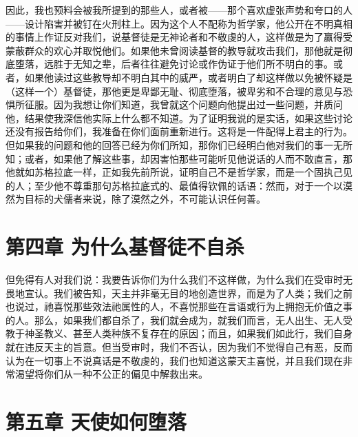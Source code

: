 因此，我也预料会被我所提到的那些人，或者被——那个喜欢虚张声势和夸口的人——设计陷害并被钉在火刑柱上。因为这个人不配称为哲学家，他公开在不明真相的事情上作证反对我们，说基督徒是无神论者和不敬虔的人，这样做是为了赢得受蒙蔽群众的欢心并取悦他们。如果他未曾阅读基督的教导就攻击我们，那他就是彻底堕落，远胜于无知之辈，后者往往避免讨论或作伪证于他们所不明白的事。或者，如果他读过这些教导却不明白其中的威严，或者明白了却这样做以免被怀疑是（这样一个）基督徒，那他更是卑鄙无耻、彻底堕落，被卑劣和不合理的意见与恐惧所征服。因为我想让你们知道，我曾就这个问题向他提出过一些问题，并质问他，结果使我深信他实际上什么都不知道。为了证明我说的是实话，如果这些讨论还没有报告给你们，我准备在你们面前重新进行。这将是一件配得上君主的行为。但如果我的问题和他的回答已经为你们所知，那你们已经明白他对我们的事一无所知；或者，如果他了解这些事，却因害怕那些可能听见他说话的人而不敢直言，那他就如苏格拉底一样，正如我先前所说，证明自己不是哲学家，而是一个固执己见的人；至少他不尊重那句苏格拉底式的、最值得钦佩的话语：然而，对于一个以漠然为目标的犬儒者来说，除了漠然之外，不可能认识任何善。\par


\section{第四章 为什么基督徒不自杀}

但免得有人对我们说：我要告诉你们为什么我们不这样做，为什么我们在受审时无畏地宣认。我们被告知，天主并非毫无目的地创造世界，而是为了人类；我们之前也说过，祂喜悦那些效法祂属性的人，不喜悦那些在言语或行为上拥抱无价值之事的人。那么，如果我们都自杀了，我们就会成为，就我们而言，无人出生、无人受教于神圣教义、甚至人类种族不复存在的原因；而且，如果我们如此行，我们自身就在违反天主的旨意。但当受审时，我们不否认，因为我们不觉得自己有恶，反而认为在一切事上不说真话是不敬虔的，我们也知道这蒙天主喜悦，并且我们现在非常渴望将你们从一种不公正的偏见中解救出来。\par


\section{第五章 天使如何堕落}

